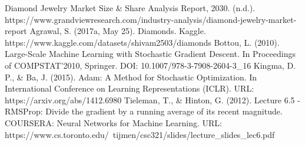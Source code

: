 \documentclass[conference]{IEEEtran}
\begin{document}
\begin{thebibliography}{00}
 Diamond Jewelry Market Size \& Share Analysis Report, 2030. (n.d.). https://www.grandviewresearch.com/industry-analysis/diamond-jewelry-market-report
 Agrawal, S. (2017a, May 25). Diamonds. Kaggle. https://www.kaggle.com/datasets/shivam2503/diamonds
 Bottou, L. (2010). Large-Scale Machine Learning with Stochastic Gradient Descent. In Proceedings of COMPSTAT'2010, Springer. DOI: 10.1007/978-3-7908-2604-3\_16
 Kingma, D. P., \& Ba, J. (2015). Adam: A Method for Stochastic Optimization. In International Conference on Learning Representations (ICLR). URL: https://arxiv.org/abs/1412.6980
 Tieleman, T., \& Hinton, G. (2012). Lecture 6.5 - RMSProp: Divide the gradient by a running average of its recent magnitude. COURSERA: Neural Networks for Machine Learning. URL: https://www.cs.toronto.edu/~tijmen/csc321/slides/lecture\_slides\_lec6.pdf

\end{thebibliography}
\vspace{12pt}
\end{document}
